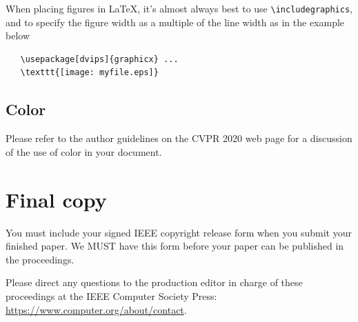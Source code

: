 \documentclass[10pt,twocolumn,a4paper]{article}
\begin{document}
When placing figures in \LaTeX, it's almost always best to use
\verb+\includegraphics+, and to specify the  figure width as a multiple of
the line width as in the example below
{\small\begin{verbatim}
   \usepackage[dvips]{graphicx} ...
   \texttt{[image: myfile.eps]}
\end{verbatim}
}


\subsection{Color}

Please refer to the author guidelines on the CVPR 2020 web page for a discussion
of the use of color in your document.

\section{Final copy}

You must include your signed IEEE copyright release form when you submit
your finished paper. We MUST have this form before your paper can be
published in the proceedings.

Please direct any questions to the production editor in charge of these 
proceedings at the IEEE Computer Society Press: 
\url{https://www.computer.org/about/contact}. 


{\small


}
\end{document}
